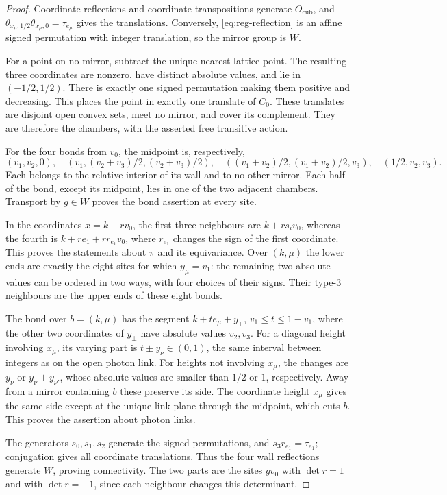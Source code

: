 \begin{proof}
Coordinate reflections and coordinate transpositions generate
$O_{\mathrm{cub}}$, and
$\theta_{x_\mu,1/2}\theta_{x_\mu,0}=\tau_{e_\mu}$ gives the
translations. Conversely, \eqref{eq:reg-reflection} is an affine signed
permutation with integer translation, so the mirror group is $W$.

For a point on no mirror, subtract the unique nearest lattice point.
The resulting three coordinates are nonzero, have distinct absolute
values, and lie in $(-1/2,1/2)$. There is exactly one signed
permutation making them positive and decreasing. This places the
point in exactly one translate of $C_0$. These translates are disjoint
open convex sets, meet no mirror, and cover its complement. They are
therefore the chambers, with the asserted free transitive action.

For the four bonds from $v_0$, the midpoint is, respectively,
\[
 (v_1,v_2,0),\quad
 (v_1,(v_2+v_3)/2,(v_2+v_3)/2),\quad
 ((v_1+v_2)/2,(v_1+v_2)/2,v_3),\quad
 (1/2,v_2,v_3).
\]
Each belongs to the relative interior of its wall and to no other
mirror. Each half of the bond, except its midpoint, lies in one of
the two adjacent chambers. Transport by $g\in W$ proves the bond
assertion at every site.

In the coordinates $x=k+rv_0$, the first three neighbours are
$k+rs_iv_0$, whereas the fourth is
$k+re_1+rr_{e_1}v_0$, where $r_{e_1}$ changes the sign of the first
coordinate. This proves the statements about $\pi$ and its
equivariance. Over $(k,\mu)$ the lower ends are exactly the eight
sites for which $y_\mu=v_1$: the remaining two absolute values can
be ordered in two ways, with four choices of their signs. Their
type-$3$ neighbours are the upper ends of these eight bonds.

The bond over $b=(k,\mu)$ has the segment
$k+te_\mu+y_\perp$, $v_1\le t\le1-v_1$, where the other two
coordinates of $y_\perp$ have absolute values $v_2,v_3$. For a
diagonal height involving $x_\mu$, its varying part is
$t\pm y_\nu\in(0,1)$, the same interval between integers as on the
open photon link. For heights not involving $x_\mu$, the changes
are $y_\nu$ or $y_\nu\pm y_{\nu'}$, whose absolute values are
smaller than $1/2$ or $1$, respectively. Away from a mirror
containing $b$ these preserve its side. The coordinate height
$x_\mu$ gives the same side except at the unique link plane through
the midpoint, which cuts $b$. This proves the assertion about
photon links.

The generators $s_0,s_1,s_2$ generate the signed permutations, and
$s_3r_{e_1}=\tau_{e_1}$; conjugation gives all coordinate translations.
Thus the four wall reflections generate $W$, proving connectivity.
The two parts are the sites $gv_0$ with $\det r=1$ and with
$\det r=-1$, since each neighbour changes this determinant.
\end{proof}

